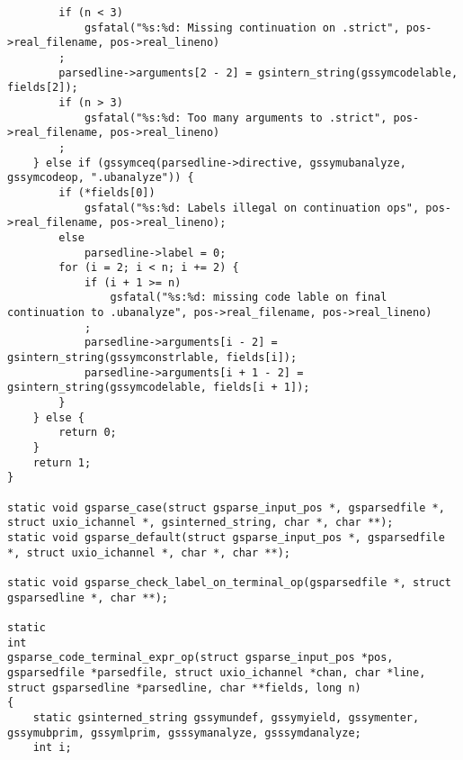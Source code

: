 \documentclass{report}
\begin{document}
\begin{verbatim}
        if (n < 3)
            gsfatal("%s:%d: Missing continuation on .strict", pos->real_filename, pos->real_lineno)
        ;
        parsedline->arguments[2 - 2] = gsintern_string(gssymcodelable, fields[2]);
        if (n > 3)
            gsfatal("%s:%d: Too many arguments to .strict", pos->real_filename, pos->real_lineno)
        ;
    } else if (gssymceq(parsedline->directive, gssymubanalyze, gssymcodeop, ".ubanalyze")) {
        if (*fields[0])
            gsfatal("%s:%d: Labels illegal on continuation ops", pos->real_filename, pos->real_lineno);
        else
            parsedline->label = 0;
        for (i = 2; i < n; i += 2) {
            if (i + 1 >= n)
                gsfatal("%s:%d: missing code lable on final continuation to .ubanalyze", pos->real_filename, pos->real_lineno)
            ;
            parsedline->arguments[i - 2] = gsintern_string(gssymconstrlable, fields[i]);
            parsedline->arguments[i + 1 - 2] = gsintern_string(gssymcodelable, fields[i + 1]);
        }
    } else {
        return 0;
    }
    return 1;
}

static void gsparse_case(struct gsparse_input_pos *, gsparsedfile *, struct uxio_ichannel *, gsinterned_string, char *, char **);
static void gsparse_default(struct gsparse_input_pos *, gsparsedfile *, struct uxio_ichannel *, char *, char **);

static void gsparse_check_label_on_terminal_op(gsparsedfile *, struct gsparsedline *, char **);

static
int
gsparse_code_terminal_expr_op(struct gsparse_input_pos *pos, gsparsedfile *parsedfile, struct uxio_ichannel *chan, char *line, struct gsparsedline *parsedline, char **fields, long n)
{
    static gsinterned_string gssymundef, gssymyield, gssymenter, gssymubprim, gssymlprim, gsssymanalyze, gsssymdanalyze;
    int i;


\end{verbatim}
\end{document}
